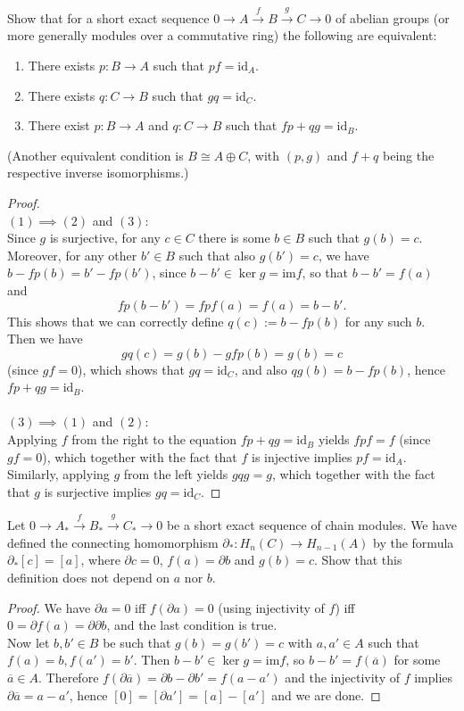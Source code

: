 \documentclass[12pt,a4paper]{article}
\newcommand{\id}{\mathrm{id}}
\newcommand{\im}{\mathrm{im}}
\newcommand{\dd}{\partial}
\begin{document}
\ex Show that for a short exact sequence $0\to A\xrightarrow{f} B\xrightarrow{g}C\to 0$ of abelian groups (or more generally modules over a commutative ring) the following are equivalent:
\begin{enumerate}[(1)]
\item There exists $p:B\to A$ such that $pf=\id_A$.
\item There exists $q:C\to B$ such that $gq=\id_C$.
\item There exist $p:B\to A$ and $q:C\to B$ such that $fp+qg=\id_B$.
\end{enumerate}
(Another equivalent condition is $B\cong A\oplus C$, with $(p,g)$ and $f+q$ being the respective inverse isomorphisms.)
\begin{proof}\mbox{}\\
$(1)\implies(2)$ and $(3)$:\\
Since $g$ is surjective, for any $c\in C$ there is some $b\in B$ such that $g(b)=c$. Moreover, for any other $b'\in B$ such that also $g(b')=c$, we have $b-fp(b)=b'-fp(b')$, since $b-b'\in\ker g=\im f$, so that $b-b'=f(a)$ and $$fp(b-b')=fpf(a)=f(a)=b-b'.$$ This shows that we can correctly define $q(c):=b-fp(b)$ for any such $b$. Then we have $$gq(c)=g(b)-gfp(b)=g(b)=c$$ (since $gf=0$), which shows that $gq=\id_C$, and also
$qg(b)=b-fp(b)$, hence $fp+qg=\id_B$.\\\\
$(3)\implies(1)$ and $(2)$:\\
Applying $f$ from the right to the equation $fp+qg=\id_B$ yields $fpf=f$ (since $gf=0$), which together with the fact that $f$ is injective implies $pf=\id_A$. Similarly, applying $g$ from the left yields $gqg=g$, which together with the fact that $g$ is surjective implies $gq=\id_C$.
\end{proof}

\ex Let $0\to A_*\xrightarrow{f} B_*\xrightarrow{g}C_*\to 0$ be a short exact sequence of chain modules. We have defined the connecting homomorphism $\dd_*:H_n(C)\to H_{n-1}(A)$ by the formula $\dd_*[c]=[a]$, where $\dd c=0$, $f(a)=\dd b$ and $g(b)=c$. Show that this definition does not depend on $a$ nor $b$.
\begin{proof}
We have $\dd a=0$ iff $f(\dd a)=0$ (using injectivity of $f$) iff $0=\dd f(a)=\dd \dd b$, and the last condition is true.\\
Now let $b,b'\in B$ be such that $g(b)=g(b')=c$ with $a,a'\in A$ such that $f(a)=b, f(a')=b'$. Then $b-b'\in \ker g=\im f$, so $b-b'=f(\overline{a})$ for some $\overline{a}\in A$. Therefore $f(\dd \overline{a})=\dd b-\dd b'=f(a-a')$ and the injectivity of $f$ implies $\dd \overline{a}=a-a'$, hence $[0]=[\dd a']=[a]-[a']$ and we are done.
\end{proof} 
\end{document}
